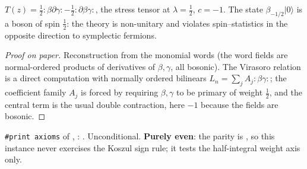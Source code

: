 \begin{physics}
$T(z)=\frac12{:}\beta\partial\gamma{:}-\frac12{:}\partial\beta\gamma{:}$, the stress tensor at
$\lambda=\frac12$, $c=-1$. The state $\beta_{-1/2}|0\rangle$ is a boson of spin $\frac12$: the
theory is non-unitary and violates spin--statistics in the opposite direction to symplectic fermions.
\end{physics}
\begin{proof}[Proof on paper]
Reconstruction from the monomial words (the word fields are normal-ordered products of derivatives
of $\beta,\gamma$, all bosonic). The Virasoro relation is a direct computation with normally ordered
bilinears $L_n=\sum_jA_j{:}\beta\gamma{:}$; the coefficient family $A_j$ is forced by requiring
$\beta,\gamma$ to be primary of weight $\frac12$, and the central term is the usual double
contraction, here $-1$ because the fields are bosonic.
\end{proof}
\begin{status}
\texttt{\#print axioms} of , :
. Unconditional. \textbf{Purely even}: the parity is ,
so this instance never exercises the Koszul sign rule; it tests the half-integral weight axis only.
\end{status}


